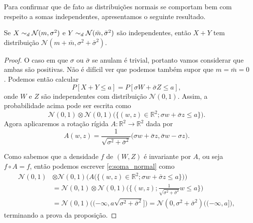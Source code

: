 Para confirmar que de fato as distribuições normais se comportam bem com respeito a somas independentes, apresentamos o seguinte resultado.

\begin{proposition}
  \label{p:soma_normais}
  Se $X \sim_d \mathcal{N}(m, \sigma^2)$ e $Y \sim_d \mathcal{N}(\bar{m}, \bar{\sigma}^2)$ são independentes, então $X + Y$ tem distribuição $\mathcal{N}(m + \bar{m}, \sigma^2 + \bar{\sigma}^2)$.
\end{proposition}

\begin{proof}
  O caso em que $\sigma$ ou $\bar{\sigma}$ se anulam é trivial, portanto vamos considerar que ambas são positivas.
  Não é difícil ver que podemos também supor que $m = \bar{m} = 0$.
  Podemos então calcular
  \begin{equation}
    P[X + Y \leq a] = P[\sigma W + \bar{\sigma} Z \leq a],
  \end{equation}
  onde $W$ e $Z$ são independentes com distribuição $\mathcal{N}(0,1)$.
  Assim, a probabilidade acima pode ser escrita como
  \begin{equation}
    \label{e:soma_normal}
    \mathcal{N}(0,1) \otimes \mathcal{N}(0,1) \Big( \big\{ (w,z) \in \mathbb{R}^2; \sigma w + \bar{\sigma} z \leq a \big\} \Big).
  \end{equation}
  Agora aplicaremos a rotação rígida $A: \mathbb{R}^2 \to \mathbb{R}^2$ dada por
  \begin{equation}
    A(w,z) = \frac{1}{\sqrt{\sigma^2 + \bar{\sigma}^2}} \big( \sigma w + \bar{\sigma} z, \bar{\sigma} w - \sigma z \big).
  \end{equation}

  Como sabemos que a densidade $f$ de $(W,Z)$ é invariante por $A$, ou seja $f \circ A = f$, então podemos escrever \eqref{e:soma_normal} como
  \begin{equation*}
    \begin{split}
      \mathcal{N}(0,1) & \otimes \mathcal{N}(0,1) \Big( A \big(\big\{ (w,z) \in \mathbb{R}^2; \sigma w + \bar{\sigma} z \leq a \big\} \big) \Big)\\
      & = \mathcal{N}(0,1) \otimes \mathcal{N}(0,1) \Big( \Big\{(w,z); \frac{1}{\sqrt{\sigma^2 + \bar{\sigma}^2}}w \leq a \Big\} \Big)\\
      & = \mathcal{N}(0,1) \big( (-\infty, a \sqrt{\sigma^2 + \bar{\sigma}^2} \big] \big) = \mathcal{N}(0,\sigma^2 + \bar{\sigma}^2) \big( (-\infty, a \big] \big),
    \end{split}
  \end{equation*}
  terminando a prova da proposição.
\end{proof}


